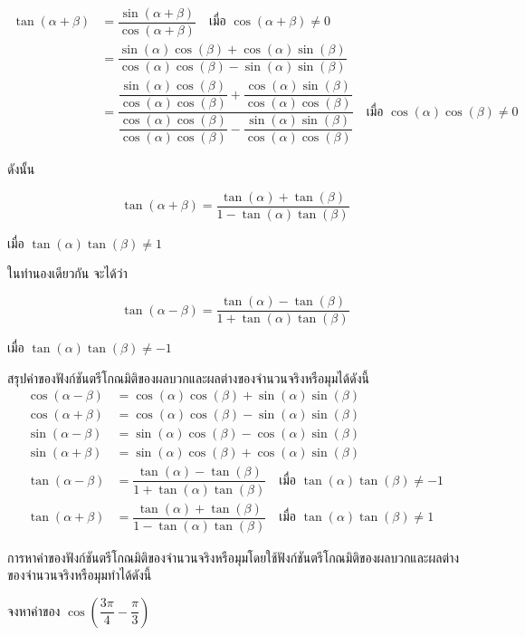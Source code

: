 \[
\begin{aligned}
	\tan(\alpha+\beta)
	&=
	\dfrac{\sin(\alpha+\beta)}
	{\cos(\alpha+\beta)}
	\quad \text{เมื่อ } \cos(\alpha+\beta)\neq 0
	\\
	&=
	\dfrac{\sin(\alpha)\cos(\beta)+\cos(\alpha)\sin(\beta)}
	{\cos(\alpha)\cos(\beta)-\sin(\alpha)\sin(\beta)}
	\\
	&=
	\dfrac{
		\dfrac{\sin(\alpha)\cos(\beta)}
		{\cos(\alpha)\cos(\beta)}
		+
		\dfrac{\cos(\alpha)\sin(\beta)}
		{\cos(\alpha)\cos(\beta)}
	}{
		\dfrac{\cos(\alpha)\cos(\beta)}
		{\cos(\alpha)\cos(\beta)}
		-
		\dfrac{\sin(\alpha)\sin(\beta)}
		{\cos(\alpha)\cos(\beta)}
	}
	\quad \text{เมื่อ } \cos(\alpha)\cos(\beta)\neq 0
\end{aligned}
\]

ดังนั้น

\[
\tan(\alpha+\beta)
=
\dfrac{\tan(\alpha)+\tan(\beta)}
{1-\tan(\alpha)\tan(\beta)}
\]

เมื่อ $\tan(\alpha)\tan(\beta)\neq 1$

\medskip

ในทำนองเดียวกัน จะได้ว่า

\[
\tan(\alpha-\beta)
=
\dfrac{\tan(\alpha)-\tan(\beta)}
{1+\tan(\alpha)\tan(\beta)}
\]

เมื่อ $\tan(\alpha)\tan(\beta)\neq -1$

\begin{remarkbox}
สรุปค่าของฟังก์ชันตรีโกณมิติของผลบวกและผลต่างของจำนวนจริงหรือมุมได้ดังนี้
	\[
\begin{aligned}
	\cos(\alpha-\beta)
	&=
	\cos(\alpha)\cos(\beta)
	+
	\sin(\alpha)\sin(\beta)
	\\[0.5em]
	\cos(\alpha+\beta)
	&=
	\cos(\alpha)\cos(\beta)
	-
	\sin(\alpha)\sin(\beta)
	\\[0.5em]
	\sin(\alpha-\beta)
	&=
	\sin(\alpha)\cos(\beta)
	-
	\cos(\alpha)\sin(\beta)
	\\[0.5em]
	\sin(\alpha+\beta)
	&=
	\sin(\alpha)\cos(\beta)
	+
	\cos(\alpha)\sin(\beta)
	\\[0.5em]
	\tan(\alpha-\beta)
	&=
	\dfrac{\tan(\alpha)-\tan(\beta)}
	{1+\tan(\alpha)\tan(\beta)}
	\quad
	\text{เมื่อ }
	\tan(\alpha)\tan(\beta)\neq -1
	\\[0.5em]
	\tan(\alpha+\beta)
	&=
	\dfrac{\tan(\alpha)+\tan(\beta)}
	{1-\tan(\alpha)\tan(\beta)}
	\quad
	\text{เมื่อ }
	\tan(\alpha)\tan(\beta)\neq 1
\end{aligned}
\]
\end{remarkbox}

\newpage
การหาค่าของฟังก์ชันตรีโกณมิติของจำนวนจริงหรือมุมโดยใช้ฟังก์ชันตรีโกณมิติของผลบวกและผลต่างของจำนวนจริงหรือมุมทำได้ดังนี้
\begin{examplebox}
	จงหาค่าของ $\cos \left( \dfrac{3 \pi}{4}-\dfrac{\pi}{3} \right)$
\end{examplebox}
\solution
\vspace{6cm}

